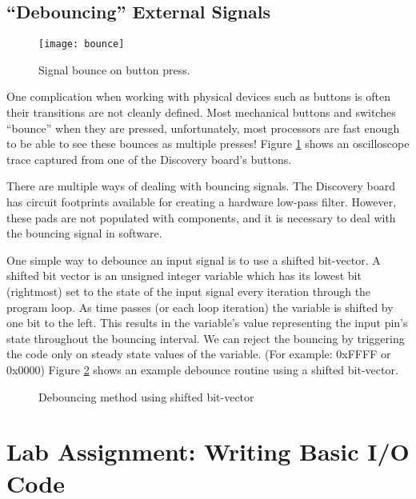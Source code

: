 \documentclass[11pt,fleqn]{book} %
\newcommand{\code}[3]{
    \begin{figure}[]
        \colorbox{gray!20!white}{
            \parbox{\linewidth-2\fboxsep} {
                \centering 
                
            }
        }
        \caption{#2}
        \label{#3}
    \end{figure}
}
\begin{document}
\subsection{``Debouncing'' External Signals} \label{bounce_section}

\begin{figure}[]
    \centering\texttt{[image: bounce]}
    \caption{Signal bounce on button press.}
    \label{bounce}
\end{figure}

One complication when working with physical devices such as buttons is often their transitions are not cleanly defined. Most mechanical buttons and switches ``bounce'' when they are pressed, unfortunately, most processors are fast enough to be able to see these bounces as multiple presses! Figure \ref{bounce} shows an oscilloscope trace captured from one of the Discovery board's buttons.

There are multiple ways of dealing with bouncing signals. The Discovery board has circuit footprints available for creating a hardware low-pass filter. However, these pads are not populated with components, and it is necessary to deal with the bouncing signal in software.

One simple way to debounce an input signal is to use a shifted bit-vector. A shifted bit vector is an unsigned integer variable which has its lowest bit (rightmost) set to the state of the input signal every iteration through the program loop. As time passes (or each loop iteration) the variable is shifted by one bit to the left. This results in the variable's value representing the input pin's state throughout the bouncing interval. We can reject the bouncing by triggering the code only on steady state values of the variable. (For example: 0xFFFF or 0x0000) Figure \ref{debounce} shows an example debounce routine using a shifted bit-vector.

\code{./files/debounce.c}{Debouncing method using shifted bit-vector}{debounce}

\section{Lab Assignment: Writing Basic I/O Code}
\end{document}
